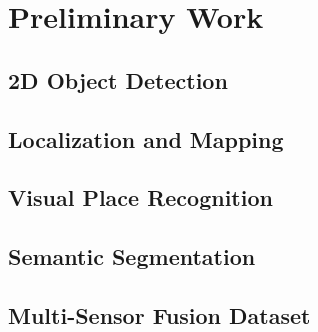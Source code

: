 \chapter{Preliminary Work}
\section{2D Object Detection}
\section{Localization and Mapping}
\section{Visual Place Recognition}
\section{Semantic Segmentation}
\section{Multi-Sensor Fusion Dataset}


